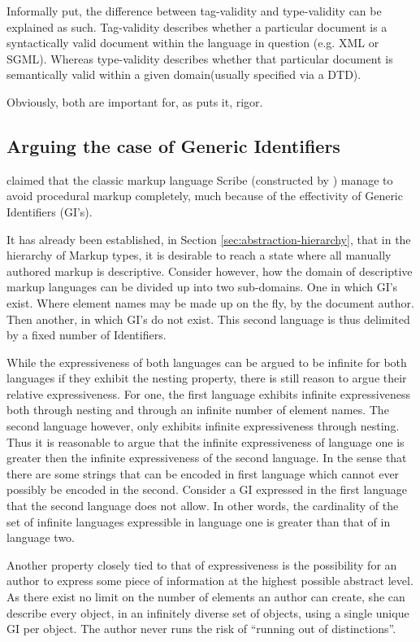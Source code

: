 \documentclass{scrreprt}
\begin{document}
Informally put, the difference between tag-validity and type-validity can be explained as such. Tag-validity describes whether a particular document is a syntactically valid document within the language in question (e.g. XML or SGML). Whereas type-validity describes whether that particular document is semantically valid within a given domain(usually specified via a DTD).

Obviously, both are important for, as \citet{goldfarb} puts it, rigor.


\subsection{Arguing the case of Generic Identifiers}
\label{sec:arguing-the-case-of-generic-identifiers}
\citet{goldfarb} claimed that the classic markup language Scribe (constructed by \citet{reid}) manage to avoid procedural markup completely, much because of the effectivity of Generic Identifiers (GI's).

It has already been established, in Section \ref{sec:abstraction-hierarchy}, that in the hierarchy of Markup types, it is desirable to reach a state where all manually authored markup is descriptive. Consider however, how the domain of descriptive markup languages can be divided up into two sub-domains. One in which GI's exist. Where element names may be made up on the fly, by the document author. Then another, in which GI's do not exist. This second language is thus delimited by a fixed number of Identifiers.

While the expressiveness of both languages can be argued to be infinite for both languages if they exhibit the nesting property, there is still reason to argue their relative expressiveness. For one, the first language exhibits infinite expressiveness both through nesting and through an infinite number of element names. The second language however, only exhibits infinite expressiveness through nesting. Thus it is reasonable to argue that the infinite expressiveness of language one is greater then the infinite expressiveness of the second language. In the sense that there are some strings that can be encoded in first language which cannot ever possibly be encoded in the second. Consider a GI expressed in the first language that the second language does not allow. In other words, the cardinality of the set of infinite languages expressible in language one is greater than that of in language two.

Another property closely tied to that of expressiveness is the possibility for an author to express some piece of information at the highest possible abstract level. As there exist no limit on the number of elements an author can create, she can describe every object, in an infinitely diverse set of objects, using a single unique GI per object. The author never runs the risk of ``running out of distinctions''.
\end{document}

